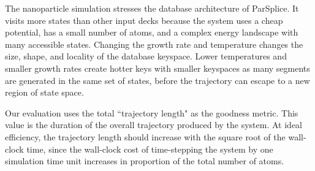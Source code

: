 The nanoparticle simulation stresses the database architecture of ParSplice. It
visits more states than other input decks because the system uses a cheap
potential, has a small number of atoms, and a complex energy landscape with
many accessible states. Changing the growth rate and temperature changes the
size, shape, and locality of the database keyspace. Lower temperatures and
smaller growth rates create hotter keys with smaller keyspaces as many segments
are generated in the same set of states, before the trajectory can escape to a
new region of state space.

Our evaluation uses the total ``trajectory length" as the goodness metric. This
value is the duration of the overall trajectory produced by the system. At
ideal efficiency, the trajectory length should increase with the square root of
the wall-clock time, since the wall-clock cost of time-stepping the system by
one simulation time unit increases in proportion of the total number of atoms.

